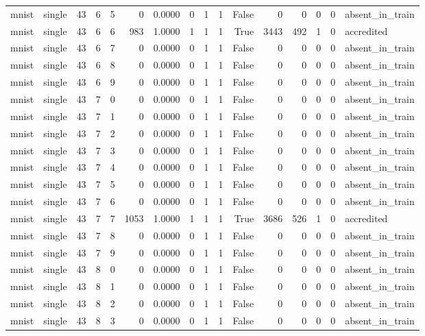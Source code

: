 \begin{tabular}{llrrrrrrrrrrrrrl}
mnist & single & 43 & 6 & 5 & 0 & 0.0000 & 0 & 1 & 1 & False & 0 & 0 & 0 & 0 & absent\_in\_train \\
mnist & single & 43 & 6 & 6 & 983 & 1.0000 & 1 & 1 & 1 & True & 3443 & 492 & 1 & 0 & accredited \\
mnist & single & 43 & 6 & 7 & 0 & 0.0000 & 0 & 1 & 1 & False & 0 & 0 & 0 & 0 & absent\_in\_train \\
mnist & single & 43 & 6 & 8 & 0 & 0.0000 & 0 & 1 & 1 & False & 0 & 0 & 0 & 0 & absent\_in\_train \\
mnist & single & 43 & 6 & 9 & 0 & 0.0000 & 0 & 1 & 1 & False & 0 & 0 & 0 & 0 & absent\_in\_train \\
mnist & single & 43 & 7 & 0 & 0 & 0.0000 & 0 & 1 & 1 & False & 0 & 0 & 0 & 0 & absent\_in\_train \\
mnist & single & 43 & 7 & 1 & 0 & 0.0000 & 0 & 1 & 1 & False & 0 & 0 & 0 & 0 & absent\_in\_train \\
mnist & single & 43 & 7 & 2 & 0 & 0.0000 & 0 & 1 & 1 & False & 0 & 0 & 0 & 0 & absent\_in\_train \\
mnist & single & 43 & 7 & 3 & 0 & 0.0000 & 0 & 1 & 1 & False & 0 & 0 & 0 & 0 & absent\_in\_train \\
mnist & single & 43 & 7 & 4 & 0 & 0.0000 & 0 & 1 & 1 & False & 0 & 0 & 0 & 0 & absent\_in\_train \\
mnist & single & 43 & 7 & 5 & 0 & 0.0000 & 0 & 1 & 1 & False & 0 & 0 & 0 & 0 & absent\_in\_train \\
mnist & single & 43 & 7 & 6 & 0 & 0.0000 & 0 & 1 & 1 & False & 0 & 0 & 0 & 0 & absent\_in\_train \\
mnist & single & 43 & 7 & 7 & 1053 & 1.0000 & 1 & 1 & 1 & True & 3686 & 526 & 1 & 0 & accredited \\
mnist & single & 43 & 7 & 8 & 0 & 0.0000 & 0 & 1 & 1 & False & 0 & 0 & 0 & 0 & absent\_in\_train \\
mnist & single & 43 & 7 & 9 & 0 & 0.0000 & 0 & 1 & 1 & False & 0 & 0 & 0 & 0 & absent\_in\_train \\
mnist & single & 43 & 8 & 0 & 0 & 0.0000 & 0 & 1 & 1 & False & 0 & 0 & 0 & 0 & absent\_in\_train \\
mnist & single & 43 & 8 & 1 & 0 & 0.0000 & 0 & 1 & 1 & False & 0 & 0 & 0 & 0 & absent\_in\_train \\
mnist & single & 43 & 8 & 2 & 0 & 0.0000 & 0 & 1 & 1 & False & 0 & 0 & 0 & 0 & absent\_in\_train \\
mnist & single & 43 & 8 & 3 & 0 & 0.0000 & 0 & 1 & 1 & False & 0 & 0 & 0 & 0 & absent\_in\_train \\

\end{tabular}

